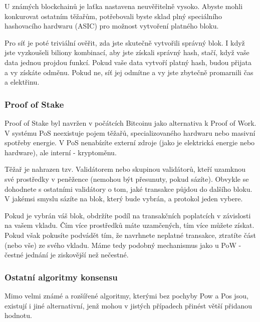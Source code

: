 U známých blockchainů je laťka nastavena neuvěřitelně vysoko. Abyste mohli konkurovat ostatním těžařům, potřebovali byste sklad plný speciálního hashovacího hardwaru (ASIC) pro možnost vytvoření platného bloku.

Pro síť je poté triviální ověřit, zda jste skutečně vytvořili správný blok. I když jste vyzkoušeli biliony kombinací, aby jste získali správný hash, stačí, když vaše data jednou projdou funkcí. Pokud vaše data vytvoří platný hash, budou přijata a vy získáte odměnu. Pokud ne, síť jej odmítne a vy jste zbytečně promarnili čas a elektřinu.	\cite{Konsensus}



\subsubsection{Proof of Stake}\label{subsubsec:PoS}

Proof of Stake byl navržen v počátcích Bitcoinu jako alternativa k Proof of Work. V systému PoS neexistuje pojem těžařů, specializovaného hardwaru nebo masivní spotřeby energie. V PoS nenabízíte externí zdroje (jako je elektrická energie nebo hardware), ale interní - kryptoměnu. 

Těžař je nahrazen tzv. Validátorem nebo skupinou validátorů, kteří uzamknou své prostředky v peněžence (nemohou být přesunuty, pokud sázíte). Obvykle se dohodnete s ostatními validátory o tom, jaké transakce půjdou do dalšího bloku. V jakémsi smyslu sázíte na blok, který bude vybrán, a protokol jeden vybere.

Pokud je vybrán váš blok, obdržíte podíl na transakčních poplatcích v závislosti na vašem vkladu. Čím více prostředků máte uzamčených, tím více můžete získat. Pokud však pokusíte podvádět tím, že navrhnete neplatné transakce, ztratíte část (nebo vše) ze svého vkladu. Máme tedy podobný mechanismus jako u PoW - čestné jednání je ziskovější než nečestné. 	\cite{Konsensus}










\subsubsection{Ostatní algoritmy konsensu}\label{subsubsec:OtherKonAlgs}

Mimo velmi známé a rozšířené algoritmy, kterými bez pochyby Pow a Pos jsou, existují i jiné alternativní, jenž mohou v jistých případech přinést větší přidanou hodnotu.

